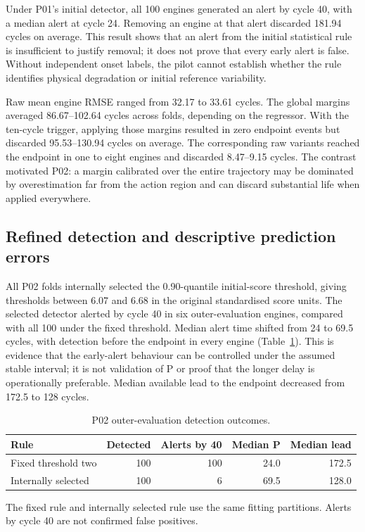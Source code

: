 \documentclass[12pt]{article}
\newcommand{\tablenotes}[1]{\par\smallskip\footnotesize #1}
\begin{document}
Under P01's initial detector, all 100 engines generated an alert by cycle 40, with a median alert at cycle 24. Removing an engine at that alert discarded 181.94 cycles on average. This result shows that an alert from the initial statistical rule is insufficient to justify removal; it does not prove that every early alert is false. Without independent onset labels, the pilot cannot establish whether the rule identifies physical degradation or initial reference variability.

Raw mean engine RMSE ranged from 32.17 to 33.61 cycles. The global margins averaged 86.67--102.64 cycles across folds, depending on the regressor. With the ten-cycle trigger, applying those margins resulted in zero endpoint events but discarded 95.53--130.94 cycles on average. The corresponding raw variants reached the endpoint in one to eight engines and discarded 8.47--9.15 cycles. The contrast motivated P02: a margin calibrated over the entire trajectory may be dominated by overestimation far from the action region and can discard substantial life when applied everywhere.

\subsection{Refined detection and descriptive prediction errors}

All P02 folds internally selected the 0.90-quantile initial-score threshold, giving thresholds between 6.07 and 6.68 in the original standardised score units. The selected detector alerted by cycle 40 in six outer-evaluation engines, compared with all 100 under the fixed threshold. Median alert time shifted from 24 to 69.5 cycles, with detection before the endpoint in every engine (Table~\ref{tab:pilot-detection}). This is evidence that the early-alert behaviour can be controlled under the assumed stable interval; it is not validation of P or proof that the longer delay is operationally preferable. Median available lead to the endpoint decreased from 172.5 to 128 cycles.

\begin{table}[htbp]
\centering
\caption{P02 outer-evaluation detection outcomes.}
\label{tab:pilot-detection}
\footnotesize
\setlength{\tabcolsep}{3pt}
\begin{tabularx}{\linewidth}{@{}Xrrrr@{}}
\toprule
Rule & Detected & Alerts by 40 & Median P & Median lead \\
\midrule
Fixed threshold two & 100 & 100 & 24.0 & 172.5 \\
Internally selected & 100 & 6 & 69.5 & 128.0 \\
\bottomrule
\end{tabularx}
\tablenotes{The fixed rule and internally selected rule use the same fitting partitions. Alerts by cycle 40 are not confirmed false positives.}
\end{table}
\end{document}
